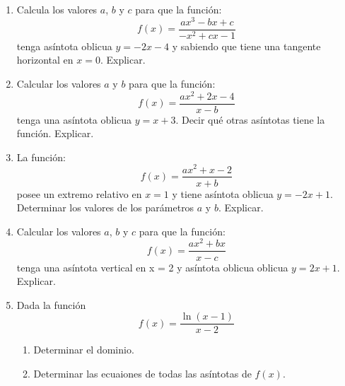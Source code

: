 \documentclass[12pt]{article}
\theoremstyle{definition}
\begin{document}
\begin{enumerate}

\item  
Calcula los valores $a$, $b$ y $c$ para que la función:
\begin{equation*}
f(x)=\frac{ax^3-bx+c}{-x^2+cx-1}
\end{equation*}
tenga  asíntota oblicua $y= -2x-4$ y sabiendo que tiene una tangente horizontal en $x=0$. Explicar.
\item  
Calcular los valores $a$ y $b$ para que la función:
\begin{equation*}
f(x)=\frac{ax^2+2x-4}{x-b}
\end{equation*} 
tenga una asíntota oblicua $y= x+3$. Decir qué otras asíntotas tiene la función. Explicar.
\item  
La función:
\begin{equation*}
f(x)=\frac{ax^2+x-2}{x+b}
\end{equation*} 
 posee un extremo relativo en $x = 1$ y tiene asíntota oblicua $y =-2x+ 1$. Determinar los valores de los parámetros $a$ y $b$. Explicar.

\item  
Calcular los valores $a$, $b$  y $c$ para que la función:
\begin{equation*}
f(x)=\frac{ax^2+bx}{x-c}
\end{equation*} 
tenga una asíntota vertical en x = 2 y asíntota oblicua oblicua $y= 2x+1$. Explicar.

\item  
Dada la función 
\begin{equation*}
f(x)=\frac{\ln (x-1)}{x-2}
\end{equation*} 
\begin{enumerate}
\item Determinar el dominio.
\item  Determinar las ecuaiones de todas las asíntotas de $f(x)$.
\end{enumerate}
\end{enumerate}
\end{document}
